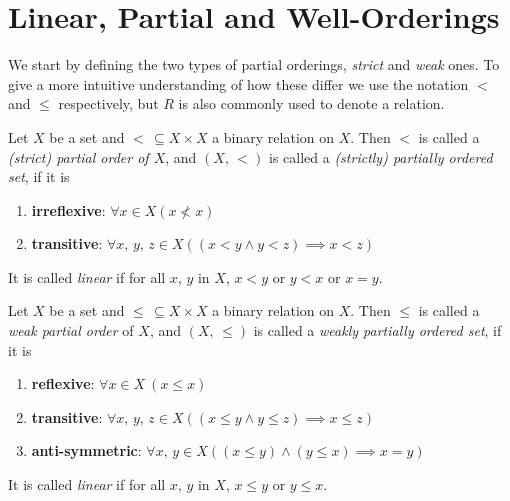 \documentclass[../../main.tex]{subfiles}
\begin{document}
\section{Linear, Partial and Well-Orderings}
We start by defining the two types of partial orderings, \textit{strict} and \textit{weak} ones.
To give a more intuitive understanding of how these differ we use the notation $<$ and $\leq$ respectively, but $R$ is also commonly used to denote a relation.

\begin{definition}\cite[p.165]{Gol17}
    Let $X$ be a set and $<\, \subseteq X \times X$ a binary relation on $X$.
    Then $<$ is called a \textit{(strict) partial order of $X$}, and $(X,\, <)$ is called a \textit{(strictly) partially ordered set}, if it is
    \begin{enumerate}[label=(\roman*)]
        \item \textbf{irreflexive}: $\forall x \in X \left(x \not < x\right)$
        \item \textbf{transitive}: $\forall x,\, y,\, z \in X \left(\left(x < y \wedge y < z\right) \implies x < z\right)$
    \end{enumerate}
    It is called \textit{linear} if for all $x$, $y$ in $X$, $x < y$ or $y < x$ or $x = y$.
\end{definition}

\begin{definition}\cite[p.164]{Gol17}
    Let $X$ be a set and $\leq\, \subseteq X \times X$ a binary relation on $X$.
    Then $\leq$ is called a \textit{weak partial order} of $X$, and $(X,\, \leq)$ is called a \textit{weakly partially ordered set}, if it is
    \begin{enumerate}[label=(\roman*)]
        \item \textbf{reflexive}: $\forall x \in X \ (x \leq x)$
        \item \textbf{transitive}: $\forall x,\, y,\, z \in X \left(\left(x \leq y \wedge y \leq z\right) \implies x \leq z\right)$
        \item \textbf{anti-symmetric}: $\forall x,\, y \in X \left((x \leq y) \wedge (y \leq x) \implies x = y\right)$
    \end{enumerate} 
    It is called \textit{linear} if for all $x$, $y$ in $X$, $x \leq y$ or $y \leq x$.
\end{definition}
\end{document}
